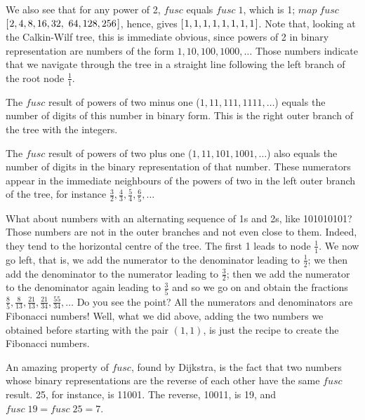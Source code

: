 \documentclass[tikz]{scrreprt}
\newcommand{\Varid}[1]{\mathit{#1}}
\begin{document}
We also see that for any power of 2,
\ensuremath{\Varid{fusc}} equals \ensuremath{\Varid{fusc}\;\mathrm{1}}, which is 1;
\ensuremath{\Varid{map}\;\Varid{fusc}} \ensuremath{[\mskip1.5mu \mathrm{2},\mathrm{4},\mathrm{8},\mathrm{16},\mathrm{32},} \ensuremath{\mathrm{64},\mathrm{128},\mathrm{256}\mskip1.5mu]}, hence,
gives \ensuremath{[\mskip1.5mu \mathrm{1},\mathrm{1},\mathrm{1},\mathrm{1},\mathrm{1},\mathrm{1},\mathrm{1},\mathrm{1}\mskip1.5mu]}.
Note that, looking at the Calkin-Wilf tree,
this is immediate obvious, since powers of 2
in binary representation are numbers of the form
$1,10,100,1000,\dots$
Those numbers indicate that 
we navigate through the tree in a straight line
following the left branch of the root node $\frac{1}{1}$.

The \ensuremath{\Varid{fusc}} result of powers of two minus one ($1,11,111,1111,\dots$)
equals the number of digits of this number in binary form.
This is the right outer branch
of the tree with the integers.

The \ensuremath{\Varid{fusc}} result of powers of two plus one ($1,11,101,1001,\dots$)
also equals the number of digits
in the binary representation of that number.
These numerators appear in the immediate neighbours
of the powers of two in the left outer branch of the tree,
for instance 
$\frac{3}{2},
 \frac{4}{3},
 \frac{5}{4},
 \frac{6}{5}, \dots$

What about numbers with an alternating sequence
of 1s and 2s, like 101010101?
Those numbers are not in the outer branches
and not even close to them. Indeed, they 
tend to the horizontal centre of the tree.
The first 1 leads to node $\frac{1}{1}$.
We now go left, that is,
we add the numerator to the denominator leading
to $\frac{1}{2}$; we then add the denominator
to the numerator leading to $\frac{3}{2}$;
then we add the numerator to the denominator again
leading to $\frac{3}{5}$ 
and so we go on and obtain the fractions
$\frac{8}{5},
 \frac{8}{13},
 \frac{21}{13},
 \frac{21}{34},
 \frac{55}{34},\dots$
Do you see the point?
All the numerators and denominators are Fibonacci numbers!
Well, what we did above,
adding the two numbers we obtained before
starting with the pair $(1,1)$,
is just the recipe
to create the Fibonacci numbers.

An amazing property of \ensuremath{\Varid{fusc}},
found by Dijkstra, is the fact that
two numbers whose binary representations
are the reverse of each other
have the same \ensuremath{\Varid{fusc}} result. 
25, for instance, is 11001.
The reverse, 10011, is 19,
and \ensuremath{\Varid{fusc}\;\mathrm{19}\mathrel{=}\Varid{fusc}\;\mathrm{25}\mathrel{=}\mathrm{7}}.
\end{document}
